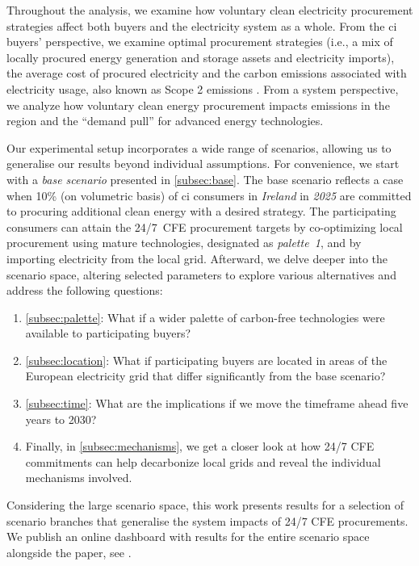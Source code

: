 
Throughout the analysis, we examine how voluntary clean electricity procurement strategies affect both buyers and the electricity system as a whole.
From the \gls{ci} buyers' perspective, we examine optimal procurement strategies (i.e., a mix of locally procured energy generation and storage assets and electricity imports), the average cost of procured electricity and the carbon emissions associated with electricity usage, also known as Scope 2 emissions \cite{GHGProtocolScope2}.
From a system perspective, we analyze how voluntary clean energy procurement impacts \co emissions in the region and the \enquote{demand pull} for advanced energy technologies.

Our experimental setup incorporates a wide range of scenarios, allowing us to generalise our results beyond individual assumptions.
For convenience, we start with a \textit{base scenario} presented in \cref{subsec:base}.
The base scenario reflects a case when 10\% (on volumetric basis) of \gls{ci} consumers in \textit{Ireland} in \textit{2025} are committed to procuring additional clean energy with a desired strategy.
The participating consumers can attain the 24/7~CFE procurement targets by co-optimizing local procurement using mature technologies, designated as \textit{palette~1}, and by importing electricity from the local grid. Afterward, we delve deeper into the scenario space, altering selected parameters to explore various alternatives and address the following questions:

\begin{enumerate}[-]
\item \cref{subsec:palette}: What if a wider palette of carbon-free technologies were available to participating buyers?
\item \cref{subsec:location}: What if participating buyers are located in areas of the European electricity grid that differ significantly from the base scenario?
\item \cref{subsec:time}: What are the implications if we move the timeframe ahead five years to 2030?
\item Finally, in \cref{subsec:mechanisms}, we get a closer look at how 24/7 CFE commitments can help decarbonize local grids and reveal the individual mechanisms involved.
\end{enumerate}

Considering the large scenario space, this work presents results for a selection of scenario branches that generalise the system impacts of 24/7 CFE procurements.
We publish an online dashboard with results for the entire scenario space alongside the paper, see .

